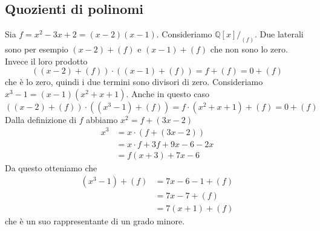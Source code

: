 \documentclass[a4paper]{article}
\begin{document}
\subsection{Quozienti di polinomi}

Sia \(f = x^2 - 3x + 2 = (x-2)(x-1)\).
Consideriamo \(\mathbb{Q}[x]/_{(f)}\).
Due laterali sono per esempio \((x-2) + (f)\)
e \((x-1) + (f)\) che non sono lo zero.
Invece il loro prodotto
\[
    \left((x-2) + (f)\right) \cdot
    \left((x-1) + (f)\right)
    = f + (f) = 0 + (f)
\]
che è lo zero, quindi i due termini sono divisori di zero.
Consideriamo \(x^3 - 1 = (x-1)(x^2 + x + 1)\).
Anche in questo caso
\[
    \left((x-2) + (f)\right) \cdot
    \left((x^3 - 1) + (f)\right) = f \cdot (x^2 + x + 1) + (f) = 0 + (f)
\]
Dalla definizione di \(f\) abbiamo \(x^2 = f + (3x-2)\)
\begin{align*}
    x^3 &= x \cdot (f + (3x-2)) \\
    &= x \cdot f + 3f + 9x-6-2x \\
    &= f(x+3) + 7x-6
\end{align*}
Da questo otteniamo che
\begin{align*}
    (x^3 - 1) + (f) &= 7x-6 - 1 + (f) \\
    &= 7x-7 + (f) \\
    &= 7(x+1) + (f)
\end{align*}
che è un suo rappresentante di un grado minore.
\end{document}
